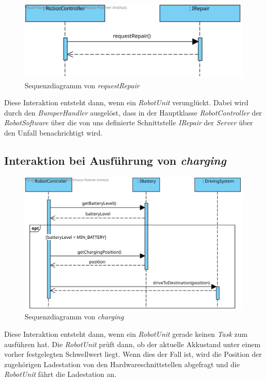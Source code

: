 \begin{figure}[H]
	\centering
	\includegraphics[width=1\textwidth]{img/8-requestRepair}
	\caption{Sequenzdiagramm von \emph{requestRepair}}
	\label{requestRepairInteraktion}
\end{figure}

Diese Interaktion entsteht dann, wenn ein \textit{RobotUnit} verunglückt. Dabei wird durch den \textit{BumperHandler} ausgelöst, dass in der Hauptklasse \textit{RobotController} der \textit{RobotSoftware} über die von uns definierte Schnittstelle \textit{IRepair} der \textit{Server} über den Unfall benachrichtigt wird.\\

\subsection*{Interaktion bei Ausführung von \textit{charging}}

\begin{figure}[H]
	\centering
	\includegraphics[width=1\textwidth]{img/0-Entwurf-8-Charging}
	\caption{Sequenzdiagramm von \emph{charging}}
	\label{chargingInteraktion}
\end{figure}

Diese Interaktion entsteht dann, wenn ein \textit{RobotUnit} gerade keinen \textit{Task} zum ausführen hat. Die \textit{RobotUnit} prüft dann, ob der aktuelle Akkustand unter einem vorher festgelegten Schwellwert liegt. Wenn dies der Fall ist, wird die Position der zugehörigen Ladestation von den Hardwareschnittstellen abgefragt und die \textit{RobotUnit} fährt die Ladestation an. \\